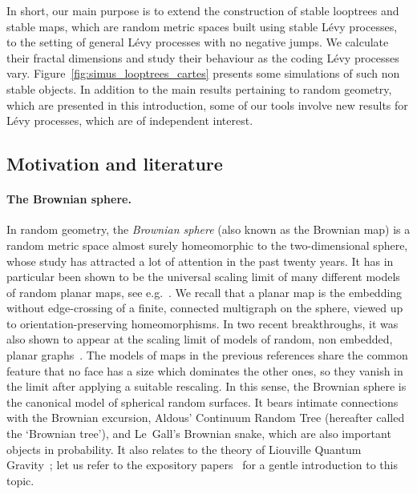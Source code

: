 \documentclass[british, a4paper,11pt]{article}
\numberwithin{equation}{section}
\theoremstyle{definition}
\begin{document}
In short, our main purpose is to extend the construction of stable looptrees and stable maps, which are random metric spaces built using stable L\'evy processes, to the setting of general L\'evy processes with no negative jumps.
We calculate their fractal dimensions and study their behaviour as the coding L\'evy processes vary.
Figure~\ref{fig:simus_looptrees_cartes} presents some simulations of such non stable objects.
In addition to the main results pertaining to random geometry, which are presented in this introduction, some of our tools involve new results for L\'evy processes, which are of independent interest.

\subsection{Motivation and literature}
\label{ssec:motiv}

\paragraph*{The Brownian sphere.}
In random geometry, the \emph{Brownian sphere} (also known as the Brownian map) is a random metric space almost surely homeomorphic to the two-dimensional sphere, whose study has attracted a lot of attention in the past twenty years. It has in particular been shown to be the universal scaling limit of many different models of random planar maps, see e.g.~\cite{LG13,Mie13,BLG13,BJM14,ABA17,ABA21,Abr16,CLG19,Mar19,KM23}. We recall that a planar map is the embedding without edge-crossing of a finite, connected multigraph on the sphere, viewed up to orientation-preserving homeomorphisms.
In two recent breakthroughs, it was also shown to appear at the scaling limit of models of random, non embedded, planar graphs~\cite{AFL23,Stu24}.
The models of maps in the previous references share the common feature that no face has a size which dominates the other ones, so they vanish in the limit after applying a suitable rescaling. In this sense, the Brownian sphere is the canonical model of spherical random surfaces.
It bears intimate connections with the Brownian excursion, Aldous' Continuum Random Tree (hereafter called the `Brownian tree'), and Le~Gall's Brownian snake, which are also important objects in probability.
It also relates to the theory of Liouville Quantum Gravity~\cite{MS20,MS21a,MS21b,MS21c}; let us refer to the 
expository papers~\cite{Mil18,Gwy20,GHS23,She23} for a gentle introduction to this topic.
\end{document}
